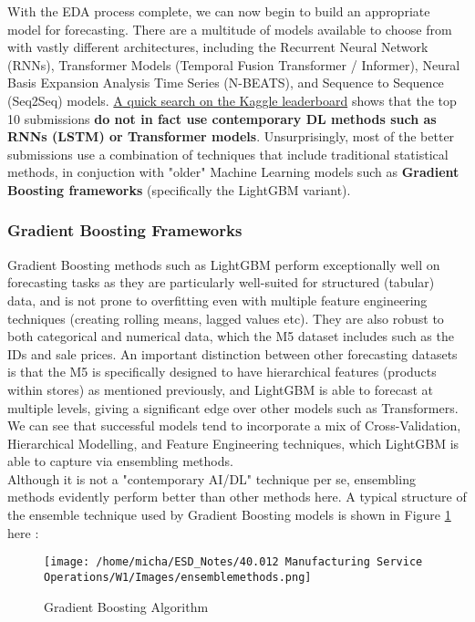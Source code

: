 \documentclass[12pt]{article}
\begin{document}
With the EDA process complete, we can now begin to build an appropriate model for forecasting. There are a multitude of models available to choose from with vastly different architectures, including the Recurrent Neural Network (RNNs), Transformer Models (Temporal Fusion Transformer / Informer), Neural Basis Expansion Analysis Time Series (N-BEATS), and Sequence to Sequence (Seq2Seq) models. \href{https://www.kaggle.com/c/m5-forecasting-accuracy/leaderboard}{A quick search on the Kaggle leaderboard} shows that the top 10 submissions \textbf{do not in fact use contemporary DL methods such as RNNs (LSTM) or Transformer models}. Unsurprisingly, most of the better submissions use a combination of techniques that include traditional statistical methods, in conjuction with "older" Machine Learning models such as \textbf{Gradient Boosting frameworks} (specifically the LightGBM variant). 

\subsubsection*{Gradient Boosting Frameworks}

Gradient Boosting methods such as LightGBM perform exceptionally well on forecasting tasks as they are particularly well-suited for structured (tabular) data, and is not prone to overfitting even with multiple feature engineering techniques (creating rolling means, lagged values etc). They are also robust to both categorical and numerical data, which the M5 dataset includes such as the IDs and sale prices. An important distinction between other forecasting datasets is that the M5 is specifically designed to have hierarchical features (products within stores) as mentioned previously, and LightGBM is able to forecast at multiple levels, giving a significant edge over other models such as Transformers. We can see that successful models tend to incorporate a mix of Cross-Validation, Hierarchical Modelling, and Feature Engineering techniques, which LightGBM is able to capture via ensembling methods. \\

\noindent Although it is not a "contemporary AI/DL" technique per se, ensembling methods evidently perform better than other methods here. A typical structure of the ensemble technique used by Gradient Boosting models is shown in Figure \ref{fig:6-gradboost} here \cite{ensemble}: 

\begin{figure}[H]
    \centering
    \texttt{[image: /home/micha/ESD\_Notes/40.012 Manufacturing Service Operations/W1/Images/ensemblemethods.png]}
    \caption{Gradient Boosting Algorithm}
    \label{fig:6-gradboost}
\end{figure} 
\end{document}

